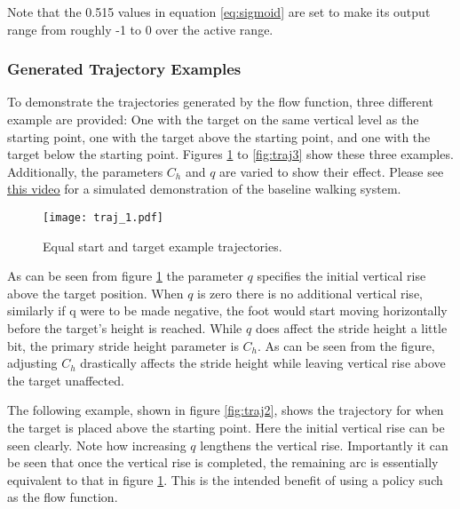                 \noindent
                Note that the 0.515 values in equation \ref{eq:sigmoid} are set to make its output range from roughly -1 to 0 over the active range.
                
                \newpage
                \subsubsection{Generated Trajectory Examples}
                To demonstrate the trajectories generated by the flow function, three different example are provided: One with the target on the same vertical level as the starting point, one with the target above the starting point, and one with the target below the starting point. Figures \ref{fig:traj1} to \ref{fig:traj3} show these three examples. Additionally, the parameters \(C_h\) and \(q\) are varied to show their effect. Please see \href{https://youtu.be/UfGo_LZfF2c}{\underline{this video}} for a simulated demonstration of the baseline walking system.
                \begin{figure}[h]
                    \centering
                    \texttt{[image: traj\_1.pdf]}
                    \caption{Equal start and target example trajectories.}
                    \label{fig:traj1}
                \end{figure}

                \noindent
                As can be seen from figure \ref{fig:traj1} the parameter \(q\) specifies the initial vertical rise above the target position. When \(q\) is zero there is no additional vertical rise, similarly if q were to be made negative, the foot would start moving horizontally before the target's height is reached. While \(q\) does affect the stride height a little bit, the primary stride height parameter is \(C_h\). As can be seen from the figure, adjusting \(C_h\) drastically affects the stride height while leaving vertical rise above the target unaffected.

                The following example, shown in figure \ref{fig:traj2}, shows the trajectory for when the target is placed above the starting point. Here the initial vertical rise can be seen clearly. Note how increasing \(q\) lengthens the vertical rise. Importantly it can be seen that once the vertical rise is completed, the remaining arc is essentially equivalent to that in figure \ref{fig:traj1}. This is the intended benefit of using a policy such as the flow function.
                
